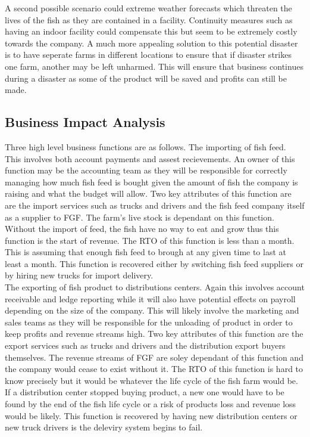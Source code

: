 \documentclass[paper=a4, fontsize=11pt]{scrartcl} %
\numberwithin{equation}{section} %
\numberwithin{figure}{section} %
\numberwithin{table}{section} %
\begin{document}
A second possible scenario could extreme weather forecasts which threaten the lives of the fish
as they are contained in a facility. Continuity measures such as having an indoor facility
could compensate this but seem to be extremely costly towards the company. A much more appealing
solution to this potential disaster is to have seperate farms in different locations to ensure
that if disaster strikes one farm, another may be left unharmed. This will ensure that business
continues during a disaster as some of the product will be saved and profits can still be made.\\

\subsection{Business Impact Analysis}

Three high level business functions are as follows. The importing of fish feed. This involves
both account payments and assest recievements. An owner of this function may be the accounting
team as they will be responsible for correctly managing how much fish feed is bought given the amount
of fish the company is raising and what the budget will allow. Two key attributes of this function
are are the import services such as trucks and drivers and the fish feed company itself as a
supplier to FGF. The farm's live stock is dependant on this function. Without the import of feed,
the fish have no way to eat and grow thus this function is the start of revenue. The RTO of this
function is less than a month. This is assuming that enough fish feed to brough at any given time
to last at least a month. This function is recovered either by switching fish feed suppliers or
by hiring new trucks for import delivery.\\

The exporting of fish product to distributions
centers. Again this involves account receivable and ledge reporting while it will also have potential
effects on payroll depending on the size of the company. This will likely involve the marketing and
sales teams as they will be responsible for the unloading of product in order to keep profits and
revenue streams high. Two key attributes of this function are the export services such as trucks
and drivers and the distribution export buyers themselves. The revenue streams of FGF are soley
dependant of this function and the company would cease to exist without it. The RTO of this 
function is hard to know precisely but it would be whatever the life cycle of the fish farm
would be. If a distribution center stopped buying product, a new one would have to be found
by the end of the fish life cycle or a risk of products loss and revenue loss would be likely.
This function is recovered by having new distribution centers or new truck drivers is the 
deleviry system begins to fail.\\
\end{document}
